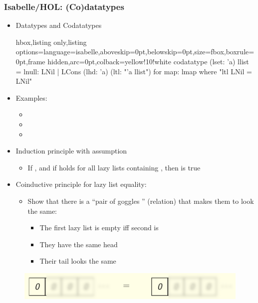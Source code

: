 \documentclass[aspectratio=169,10pt]{beamer}
\begin{document}
\begin{frame}
  \frametitle{Isabelle/HOL: (Co)datatypes}
  \begin{itemize}
    \item Datatypes and Codatatypes
\vspace*{-1ex}
          \begin{tcblisting}{hbox,listing only,listing options={language=isabelle,aboveskip=0pt,belowskip=0pt},size=fbox,boxrule=0pt,frame hidden,arc=0pt,colback=yellow!10!white}
codatatype (lset: 'a) llist = lnull: LNil | LCons (lhd: 'a) (ltl: "'a llist")
  for map: lmap where "ltl LNil = LNil"
          \end{tcblisting}
\vspace*{-1ex}
    \item Examples:
          \begin{itemize}
            \item {}
            \item {}
            \item {}
          \end{itemize}
\vspace*{-1ex}
    \item Induction principle with  assumption
          \begin{itemize}
            \item If , and if  holds for all lazy lists containing , then  is true
          \end{itemize}
    \item Coinductive principle for lazy list equality:
          \begin{itemize}
            \item Show that there is a ``pair of goggles '' (relation) that makes them to look the same:
                  \begin{itemize}
                    \item The first lazy list is empty iff second is
                    \item They have the same head
                    \item Their tail looks the same
                  \end{itemize}
          \end{itemize}
  \end{itemize}
\vspace*{-1ex}
\begin{overlayarea}{\textwidth}{.45\textheight}
  \begin{figure}
    \centering
    \includegraphics[scale=0.3]{equality_2.png}
  \end{figure}
\end{overlayarea}
\end{frame}
\end{document}
